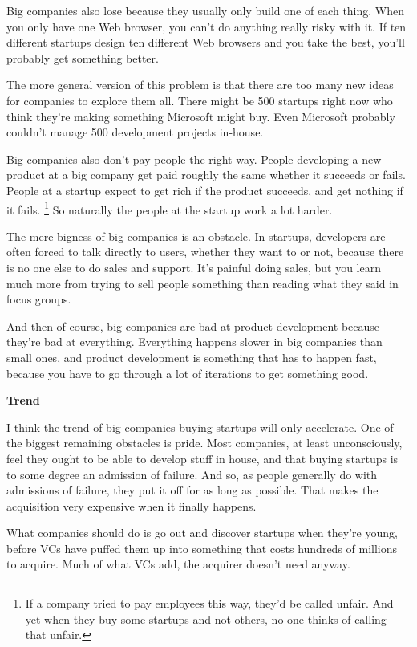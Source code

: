 Big companies also lose because they usually only build one of each
thing. When you only have one Web browser, you can't do anything really
risky with it. If ten different startups design ten different Web
browsers and you take the best, you'll probably get something better.

The more general version of this problem is that there are too many new
ideas for companies to explore them all. There might be 500 startups
right now who think they're making something Microsoft might buy. Even
Microsoft probably couldn't manage 500 development projects in-house.

Big companies also don't pay people the right way. People developing a
new product at a big company get paid roughly the same whether it
succeeds or fails. People at a startup expect to get rich if the product
succeeds, and get nothing if it fails. \footnote{If a company tried to pay employees this way, they'd be called
unfair. And yet when they buy some startups and not others, no one
thinks of calling that unfair.} So
naturally the people at the startup work a lot harder.

The mere bigness of big companies is an obstacle. In startups,
developers are often forced to talk directly to users, whether they want
to or not, because there is no one else to do sales and support. It's
painful doing sales, but you learn much more from trying to sell people
something than reading what they said in focus groups.

And then of course, big companies are bad at product development because
they're bad at everything. Everything happens slower in big companies
than small ones, and product development is something that has to happen
fast, because you have to go through a lot of iterations to get
something good.

\textbf{Trend}

I think the trend of big companies buying startups will only accelerate.
One of the biggest remaining obstacles is pride. Most companies, at
least unconsciously, feel they ought to be able to develop stuff in
house, and that buying startups is to some degree an admission of
failure. And so, as people generally do with admissions of failure, they
put it off for as long as possible. That makes the acquisition very
expensive when it finally happens.

What companies should do is go out and discover startups when they're
young, before VCs have puffed them up into something that costs hundreds
of millions to acquire. Much of what VCs add, the acquirer doesn't need
anyway.

